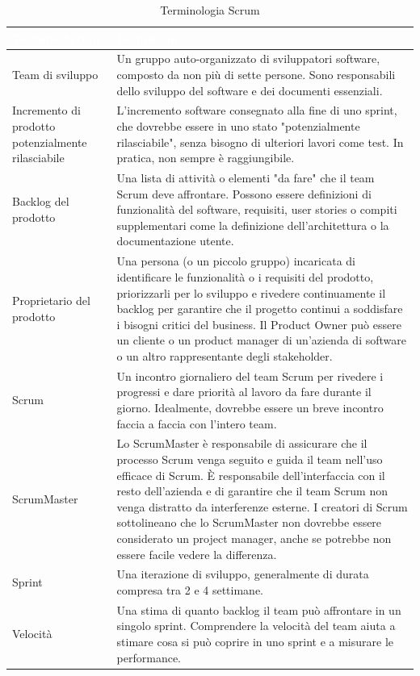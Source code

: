 \begin{table}[ht]
\centering
{}
\begin{tabular}{|p{4cm}|p{11cm}|}
\hline
\rowcolor{headerblue}
\textbf{\textcolor{white}{Termine Scrum}} & \textbf{\textcolor{white}{Definizione}} \\\hline
Team di sviluppo & Un gruppo auto-organizzato di sviluppatori software, composto da non più di sette persone. Sono responsabili dello sviluppo del software e dei documenti essenziali.
\\\hline
Incremento di prodotto potenzialmente rilasciabile & L'incremento software consegnato alla fine di uno sprint, che dovrebbe essere in uno stato "potenzialmente rilasciabile", senza bisogno di ulteriori lavori come test. In pratica, non sempre è raggiungibile.
\\\hline
Backlog del prodotto & Una lista di attività o elementi "da fare" che il team Scrum deve affrontare. Possono essere definizioni di funzionalità del software, requisiti, user stories o compiti supplementari come la definizione dell'architettura o la documentazione utente.
\\\hline
Proprietario del prodotto & Una persona (o un piccolo gruppo) incaricata di identificare le funzionalità o i requisiti del prodotto, priorizzarli per lo sviluppo e rivedere continuamente il backlog per garantire che il progetto continui a soddisfare i bisogni critici del business. Il Product Owner può essere un cliente o un product manager di un'azienda di software o un altro rappresentante degli stakeholder.
\\\hline
Scrum & Un incontro giornaliero del team Scrum per rivedere i progressi e dare priorità al lavoro da fare durante il giorno. Idealmente, dovrebbe essere un breve incontro faccia a faccia con l'intero team.
\\\hline
ScrumMaster & Lo ScrumMaster è responsabile di assicurare che il processo Scrum venga seguito e guida il team nell'uso efficace di Scrum. È responsabile dell'interfaccia con il resto dell'azienda e di garantire che il team Scrum non venga distratto da interferenze esterne. I creatori di Scrum sottolineano che lo ScrumMaster non dovrebbe essere considerato un project manager, anche se potrebbe non essere facile vedere la differenza.
\\\hline
Sprint & Una iterazione di sviluppo, generalmente di durata compresa tra 2 e 4 settimane.
\\\hline
Velocità & Una stima di quanto backlog il team può affrontare in un singolo sprint. Comprendere la velocità del team aiuta a stimare cosa si può coprire in uno sprint e a misurare le performance.
\\\hline
\end{tabular}
\caption{Terminologia Scrum}
\label{tab:terminologia-scrum}
\end{table}

